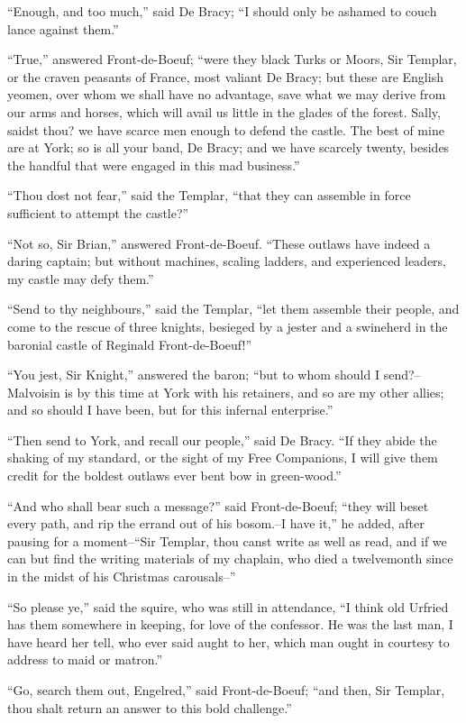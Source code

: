 ``Enough, and too much,'' said De Bracy; ``I should only be ashamed to
couch lance against them.''

``True,'' answered Front-de-Boeuf; ``were they black Turks or Moors, Sir
Templar, or the craven peasants of France, most valiant De Bracy; but
these are English yeomen, over whom we shall have no advantage, save
what we may derive from our arms and horses, which will avail us little
in the glades of the forest. Sally, saidst thou? we have scarce men
enough to defend the castle. The best of mine are at York; so is all
your band, De Bracy; and we have scarcely twenty, besides the handful
that were engaged in this mad business.''

``Thou dost not fear,'' said the Templar, ``that they can assemble in
force sufficient to attempt the castle?''

``Not so, Sir Brian,'' answered Front-de-Boeuf. ``These outlaws have
indeed a daring captain; but without machines, scaling ladders, and
experienced leaders, my castle may defy them.''

``Send to thy neighbours,'' said the Templar, ``let them assemble their
people, and come to the rescue of three knights, besieged by a jester
and a swineherd in the baronial castle of Reginald Front-de-Boeuf!''

``You jest, Sir Knight,'' answered the baron; ``but to whom should I
send?--Malvoisin is by this time at York with his retainers, and so are
my other allies; and so should I have been, but for this infernal
enterprise.''

``Then send to York, and recall our people,'' said De Bracy. ``If they
abide the shaking of my standard, or the sight of my Free Companions, I
will give them credit for the boldest outlaws ever bent bow in
green-wood.''

``And who shall bear such a message?'' said Front-de-Boeuf; ``they will
beset every path, and rip the errand out of his bosom.--I have it,'' he
added, after pausing for a moment--``Sir Templar, thou canst write as
well as read, and if we can but find the writing materials of my
chaplain, who died a twelvemonth since in the midst of his Christmas
carousals--''

``So please ye,'' said the squire, who was still in attendance, ``I
think old Urfried has them somewhere in keeping, for love of the
confessor. He was the last man, I have heard her tell, who ever said
aught to her, which man ought in courtesy to address to maid or
matron.''

``Go, search them out, Engelred,'' said Front-de-Boeuf; ``and then, Sir
Templar, thou shalt return an answer to this bold challenge.''

